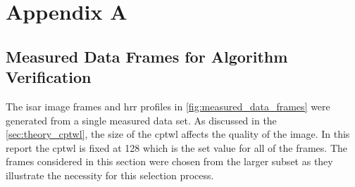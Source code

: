 \documentclass[class=report,11pt,crop=false]{standalone}
\begin{document}
\chapter{Appendix A \label{apndxA}}
\section{Measured Data Frames for Algorithm Verification} \label{apndxA:verification_frames}
    The \gls{isar} image frames and \gls{hrr} profiles in \autoref{fig:measured_data_frames} were generated from a single measured data set. As discussed in the \autoref{sec:theory_cptwl}, the size of the \gls{cptwl} affects the quality of the image. In this report the \gls{cptwl} is fixed at 128 which is the set value for all of the frames. The frames considered in this section were chosen from the larger subset as they illustrate the necessity for this selection process. 
\end{document}
